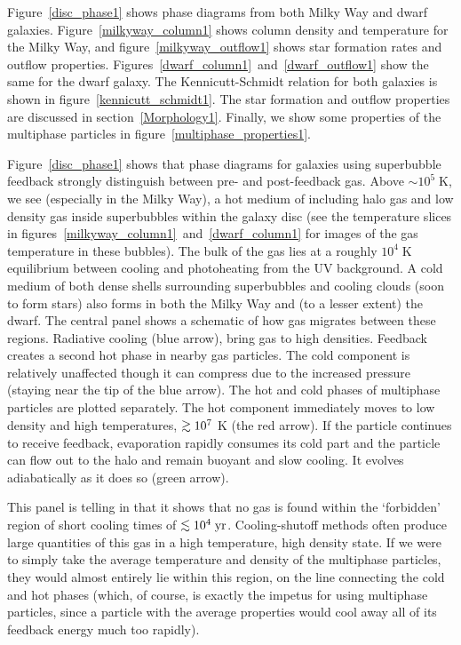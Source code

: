 Figure~\ref{disc_phase1} shows phase diagrams from both Milky Way and dwarf
galaxies.  Figure~\ref{milkyway_column1} shows column density and temperature for
the Milky Way, and figure~\ref{milkyway_outflow1} shows star formation rates and
outflow properties.  Figures~\ref{dwarf_column1}~and~\ref{dwarf_outflow1} show the
same for the dwarf galaxy.  The Kennicutt-Schmidt relation for both galaxies is
shown in figure~\ref{kennicutt_schmidt1}.  The star formation and outflow properties are
discussed in section~\ref{Morphology1}.  Finally, we show some properties of the
multiphase particles in figure~\ref{multiphase_properties1}.

Figure~\ref{disc_phase1} shows that phase diagrams for galaxies using superbubble
feedback strongly distinguish between pre- and post-feedback gas.  Above $\sim
10^5\;\mathrm{K}$, we see (especially in the Milky Way), a hot medium of
including halo gas and low density gas inside superbubbles within the galaxy
disc (see the temperature slices in
figures~\ref{milkyway_column1}~and~\ref{dwarf_column1} for images of the gas
temperature in these bubbles).  The bulk of the gas lies at a roughly $10^4\;
\mathrm{K}$ equilibrium between cooling and photoheating from the UV background.
A cold medium of both dense shells surrounding superbubbles and cooling clouds
(soon to form stars) also forms in both the Milky Way and (to a lesser extent)
the dwarf.  The central panel shows a schematic of how gas migrates between
these regions.  Radiative cooling (blue arrow), bring gas to high densities.
Feedback creates a second hot phase in nearby gas particles.  The cold component
is relatively unaffected though it can compress due to the increased pressure
(staying near the tip of the blue arrow).  The hot and cold phases of multiphase
particles are plotted separately.  The hot component immediately moves to low
density and high temperatures,  $\gta 10^7$ K (the red arrow).  If the particle
continues to receive feedback, evaporation rapidly consumes its cold part and
the particle can flow out to the halo and remain buoyant and slow cooling.  It
evolves adiabatically as it does so (green arrow).

This panel is telling in that it shows that no gas is found within the
`forbidden' region of short cooling times of $\lta 10^4\;\mathrm{yr}$.
Cooling-shutoff methods often produce large quantities of this gas in a high
temperature, high density state.  If we were to simply take the average
temperature and density of the multiphase particles, they would almost entirely
lie within this region, on the line connecting the cold and hot phases (which,
of course, is exactly the impetus for using multiphase particles, since a
particle with the average properties would cool away all of its feedback energy
much too rapidly).

